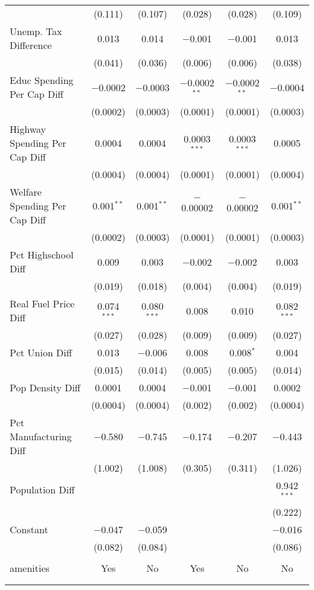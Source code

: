 \begin{table}[!htbp]
\begin{tabular}{@{\extracolsep{5pt}}lccccc}
  & (0.111) & (0.107) & (0.028) & (0.028) & (0.109) \\ 
  Unemp. Tax Difference & 0.013 & 0.014 & $-$0.001 & $-$0.001 & 0.013 \\ 
  & (0.041) & (0.036) & (0.006) & (0.006) & (0.038) \\ 
  Educ Spending Per Cap Diff & $-$0.0002 & $-$0.0003 & $-$0.0002$^{**}$ & $-$0.0002$^{**}$ & $-$0.0004 \\ 
  & (0.0002) & (0.0003) & (0.0001) & (0.0001) & (0.0003) \\ 
  Highway Spending Per Cap Diff & 0.0004 & 0.0004 & 0.0003$^{***}$ & 0.0003$^{***}$ & 0.0005 \\ 
  & (0.0004) & (0.0004) & (0.0001) & (0.0001) & (0.0004) \\ 
  Welfare Spending Per Cap Diff & 0.001$^{**}$ & 0.001$^{**}$ & $-$0.00002 & $-$0.00002 & 0.001$^{**}$ \\ 
  & (0.0002) & (0.0003) & (0.0001) & (0.0001) & (0.0003) \\ 
  Pct Highschool Diff & 0.009 & 0.003 & $-$0.002 & $-$0.002 & 0.003 \\ 
  & (0.019) & (0.018) & (0.004) & (0.004) & (0.019) \\ 
  Real Fuel Price Diff & 0.074$^{***}$ & 0.080$^{***}$ & 0.008 & 0.010 & 0.082$^{***}$ \\ 
  & (0.027) & (0.028) & (0.009) & (0.009) & (0.027) \\ 
  Pct Union Diff & 0.013 & $-$0.006 & 0.008 & 0.008$^{*}$ & 0.004 \\ 
  & (0.015) & (0.014) & (0.005) & (0.005) & (0.014) \\ 
  Pop Density Diff & 0.0001 & 0.0004 & $-$0.001 & $-$0.001 & 0.0002 \\ 
  & (0.0004) & (0.0004) & (0.002) & (0.002) & (0.0004) \\ 
  Pct Manufacturing Diff & $-$0.580 & $-$0.745 & $-$0.174 & $-$0.207 & $-$0.443 \\ 
  & (1.002) & (1.008) & (0.305) & (0.311) & (1.026) \\ 
  Population Diff &  &  &  &  & 0.942$^{***}$ \\ 
  &  &  &  &  & (0.222) \\ 
  Constant & $-$0.047 & $-$0.059 &  &  & $-$0.016 \\ 
  & (0.082) & (0.084) &  &  & (0.086) \\ 
 \hline \\[-1.8ex] 
amenities & Yes & No & Yes & No & No \\ 
\hline \\[-1.8ex] 
\hline 
\hline \\[-1.8ex] 
\end{tabular} 
\end{table} 
